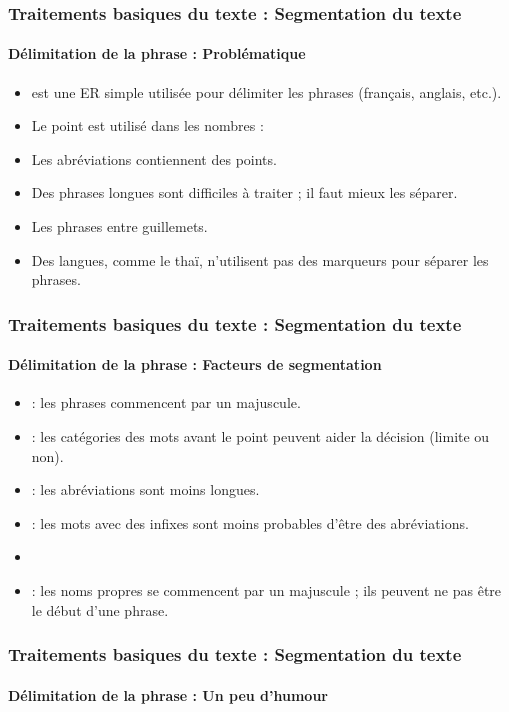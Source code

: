 \documentclass[xcolor=table]{beamer}
\begin{document}
\begin{frame}
\frametitle{Traitements basiques du texte : Segmentation du texte}
\framesubtitle{Délimitation de la phrase : Problématique} 

\begin{itemize}
	\item \expword{/[.?!]/} est une ER simple utilisée pour délimiter les phrases (français, anglais, etc.).
	\item Le point est utilisé dans les nombres : 
	\item Les abréviations contiennent des points.
	\item Des phrases longues sont difficiles à traiter ; il faut mieux les séparer.
	\item Les phrases entre guillemets.
	\item Des langues, comme le thaï, n'utilisent pas des marqueurs pour séparer les phrases.
\end{itemize}

\end{frame}

\begin{frame}
\frametitle{Traitements basiques du texte : Segmentation du texte}
\framesubtitle{Délimitation de la phrase : Facteurs de segmentation} 

\begin{itemize}
	\item {} : les phrases commencent par un majuscule.
	\item {} : les catégories des mots avant le point peuvent aider la décision (limite ou non).
	\item {} : les abréviations sont moins longues.
	\item {} : les mots avec des infixes sont moins probables d'être des abréviations.
	\item {} 
	\item {} : les noms propres se commencent par un majuscule ; ils peuvent ne pas être le début d'une phrase.
\end{itemize}

\end{frame}

\begin{frame}
\frametitle{Traitements basiques du texte : Segmentation du texte}
\framesubtitle{Délimitation de la phrase : Un peu d'humour} 


\end{frame}
\end{document}
